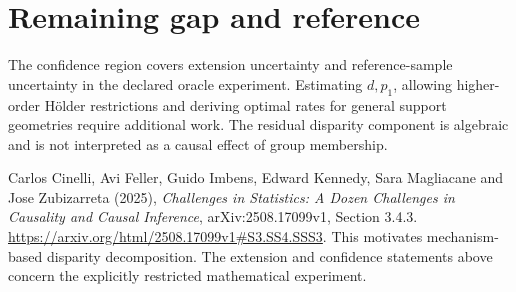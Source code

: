 \documentclass[11pt,a4paper]{article}
\theoremstyle{definition}
\theoremstyle{remark}
\begin{document}
\section{Remaining gap and reference}
The confidence region covers extension uncertainty and reference-sample uncertainty in the declared oracle experiment. Estimating $d,p_1$, allowing higher-order H\"older restrictions and deriving optimal rates for general support geometries require additional work. The residual disparity component is algebraic and is not interpreted as a causal effect of group membership.

Carlos Cinelli, Avi Feller, Guido Imbens, Edward Kennedy, Sara Magliacane and Jose Zubizarreta (2025), \emph{Challenges in Statistics: A Dozen Challenges in Causality and Causal Inference}, arXiv:2508.17099v1, Section 3.4.3. \url{https://arxiv.org/html/2508.17099v1#S3.SS4.SSS3}. This motivates mechanism-based disparity decomposition. The extension and confidence statements above concern the explicitly restricted mathematical experiment.
\end{document}
